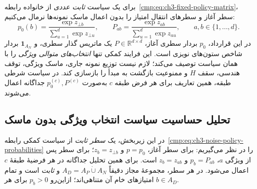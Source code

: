 برای یک سیاست \emph{ثابت عددی} از خانواده
رابطه~\eqref{cmp:eq:ch3-fixed-policy-matrix}،
سطر آغاز و سطرهای انتقال امتیاز را بدون اعمال
ماسک نمونه‌ها نرمال می‌کنیم:
\begin{equation}\label{cmp:eq:ch3-noise-policy-probabilities}
p_0(b)=\frac{\exp z_{\bot b}}{\sum_{u=1}^{d}\exp z_{\bot u}},
\qquad
P_{ab}=\frac{\exp z_{ab}}{\sum_{u=1}^{d}\exp z_{au}},
\qquad a,b\in\{1,\ldots,d\}.
\end{equation}
در این قرارداد، $p_0$ بردار سطری آغاز،
$P\in\mathbb R^{d\times d}$ یک ماتریس گذار سطری،
و $\mathbf 1_{A_N}$ بردار شاخص ستون‌های نویزی است.
این فرایند کمکی تنها \emph{انتخاب‌های متوالی ویژگی} را
با همان سیاست توصیف می‌کند؛ لازم نیست توزیع
نمونه جاری، ماسک ویژگی، توقف هندسی، سقف $H$ و
ممنوعیت بازگشت به مبدأ را بازسازی کند.
در سیاست شرطی طبقه، همین تعاریف برای هر فرض طبقه
$c$ به‌صورت $p_0^{(c)},P^{(c)}$ جداگانه اعمال می‌شوند.



\subsection{تحلیل حساسیت سیاست انتخاب ویژگی بدون ماسک}
\label{cmp:subsec:ch3-noise-logpolicy-sensitivity}
در این زیربخش، یک \emph{سطر ثابت} از سیاست کمکی
رابطه~\eqref{cmp:eq:ch3-noise-policy-probabilities}
را در نظر می‌گیریم: برای سطر آغاز، $p=p_0$ و
$z_b=z_{\bot b}$؛ برای سطر پس از ویژگی $a$،
$p_b=P_{ab}$ و $z_b=z_{ab}$ است.
برای  همین تحلیل جداگانه در هر فرضیهٔ
طبقهٔ $c$ اعمال می‌شود.
در هر سطر، مجموعهٔ مجاز دقیقاً $A_D=A_P\mathbin{\dot\cup}A_N$
و \emph{ثابت} است و تمام امتیازهای خام آن متناهی‌اند؛
ازاین‌رو $p_b>0$ برای هر $b\in A_D$.


